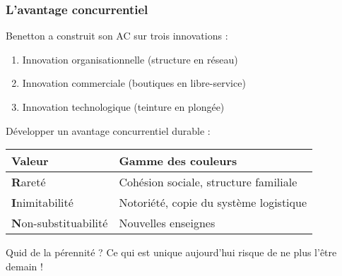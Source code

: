	\subsubsection{L'avantage concurrentiel}
		Benetton a construit son AC sur trois innovations :

		\begin{enumerate}
			\item Innovation organisationnelle (structure en réseau)
			\item Innovation commerciale (boutiques en libre-service)
			\item Innovation technologique (teinture en plongée)
		\end{enumerate}

		Développer un avantage concurrentiel durable :

		\begin{tabular}{l|p{10cm}}
			\textbf{V}aleur & Gamme des couleurs\\
			\hline
			\textbf{R}areté & Cohésion sociale, structure familiale\\
			\hline
			\textbf{I}nimitabilité & Notoriété, copie du système logistique\\
			\hline
			\textbf{N}on-substituabilité & Nouvelles enseignes\\
		\end{tabular}

		Quid de la pérennité ? Ce qui est unique aujourd'hui risque de ne plus l'être demain !
